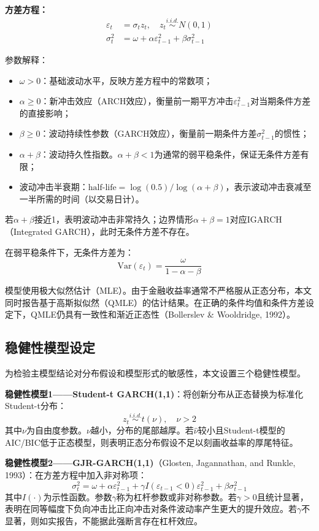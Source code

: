 \documentclass[11pt,a4paper]{article}
\begin{document}
\textbf{方差方程：}
\begin{align}
\varepsilon_t &= \sigma_t z_t, \quad z_t \stackrel{i.i.d.}{\sim} N(0,1) \\
\sigma_t^2 &= \omega + \alpha \varepsilon_{t-1}^2 + \beta \sigma_{t-1}^2
\end{align}

参数解释：
\begin{itemize}[nosep]
\item \(\omega > 0\)：基础波动水平，反映方差方程中的常数项；
\item \(\alpha \geq 0\)：新冲击效应（ARCH效应），衡量前一期平方冲击\(\varepsilon_{t-1}^2\)对当期条件方差的直接影响；
\item \(\beta \geq 0\)：波动持续性参数（GARCH效应），衡量前一期条件方差\(\sigma_{t-1}^2\)的惯性；
\item \(\alpha + \beta\)：波动持久性指数。\(\alpha + \beta < 1\)为通常的弱平稳条件，保证无条件方差有限；
\item 波动冲击半衰期：\(\text{half-life} = \log(0.5) / \log(\alpha + \beta)\)，表示波动冲击衰减至一半所需的时间（以交易日计）。
\end{itemize}

若\(\alpha + \beta\)接近1，表明波动冲击非常持久；边界情形\(\alpha + \beta = 1\)对应IGARCH（Integrated GARCH），此时无条件方差不存在。

在弱平稳条件下，无条件方差为：
\[
\text{Var}(\varepsilon_t) = \frac{\omega}{1 - \alpha - \beta}
\]

模型使用极大似然估计（MLE）。由于金融收益率通常不严格服从正态分布，本文同时报告基于高斯拟似然（QMLE）的估计结果。在正确的条件均值和条件方差设定下，QMLE仍具有一致性和渐近正态性（Bollerslev \& Wooldridge, 1992）。

\subsection{稳健性模型设定}

为检验主模型结论对分布假设和模型形式的敏感性，本文设置三个稳健性模型。

\textbf{稳健性模型1——Student-t GARCH(1,1)}：将创新分布从正态替换为标准化Student-t分布：
\[
z_t \stackrel{i.i.d.}{\sim} t(\nu), \quad \nu > 2
\]
其中\(\nu\)为自由度参数。\(\nu\)越小，分布的尾部越厚。若\(\hat{\nu}\)较小且Student-t模型的AIC/BIC低于正态模型，则表明正态分布假设不足以刻画收益率的厚尾特征。

\textbf{稳健性模型2——GJR-GARCH(1,1)}（Glosten, Jagannathan, and Runkle, 1993）：在方差方程中加入非对称项：
\[
\sigma_t^2 = \omega + \alpha \varepsilon_{t-1}^2 + \gamma I(\varepsilon_{t-1} < 0) \varepsilon_{t-1}^2 + \beta \sigma_{t-1}^2
\]
其中\(I(\cdot)\)为示性函数。参数\(\gamma\)称为杠杆参数或非对称参数。若\(\gamma > 0\)且统计显著，表明在同等幅度下负向冲击比正向冲击对条件波动率产生更大的提升效应。若\(\gamma\)不显著，则如实报告，不能据此强断言存在杠杆效应。
\end{document}
